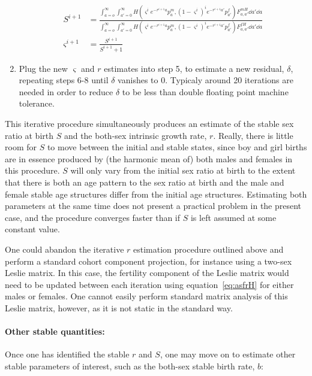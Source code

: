\begin{enumerate}
  \begin{align}
  S^{i+1} &= \frac{\int_{a=o}^\infty \int_{a'=0}^\infty H(\varsigma^i
  e^{-r^{i+1}a} p_a^m, (1-\varsigma^i)^i e^{-r^{i+1}a'}p_{a'}^f) F_{a,a'}^{mH} \dd a' \dd a
  }{\int_{a=o}^\infty \int_{a'=0}^\infty H(\varsigma^i e^{-r^{i+1}a}
  p_a^m, (1-\varsigma^i)^i e^{-r^{i+1}a'}p_{a'}^f) F_{a,a'}^{fH} \dd a' \dd a }
  \\
  \varsigma^{i+1} &= \frac{S^{i+1}}{S^{i+1}+1}
  \end{align}
  \item Plug the new $\varsigma$ and $r$ estimates into step 5, to estimate a
  new residual, $\delta$, repeating steps 6-8 until $\delta$ vanishes to 0.
  Typicaly around 20 iterations are needed in order to reduce $\delta$ to
  be less than double floating point machine tolerance.
\end{enumerate}

This iterative procedure simultaneously produces an estimate of the stable
sex ratio at birth $S$ and the both-sex intrinsic growth rate, $r$. Really,
there is little room for $S$ to move between the initial and stable states,
since boy and girl births are in essence produced by (the harmonic mean of) both
males and females in this procedure. $S$
will only vary from the initial sex ratio at birth to the extent that there is
both an age pattern to the sex ratio at birth and the male and female stable age
structures differ from the initial age structures. Estimating both parameters at
the same time does not present a practical problem in the present case, and the
procedure converges faster than if $S$ is left assumed at some constant value.

One could abandon the iterative $r$ estimation procedure outlined above
and perform a standard cohort component projection, for instance using a
two-sex Leslie matrix. In this case, the fertility component of the Leslie
matrix would need to be updated between each iteration using equation~\ref{eq:asfrH} for either
males or females. One cannot easily perform standard matrix analysis of this
Leslie matrix, however, as it is not static in the standard way.

\paragraph{Other stable quantities: } Once one has identified the stable $r$ and
$S$, one may move on to estimate other stable parameters of interest, such as the 
both-sex stable birth rate, $b$:

